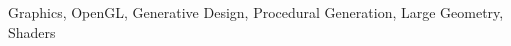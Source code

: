 
% 
% 

\begin{keywords}

Graphics, OpenGL, Generative Design, Procedural Generation, Large Geometry, Shaders

\end{keywords}